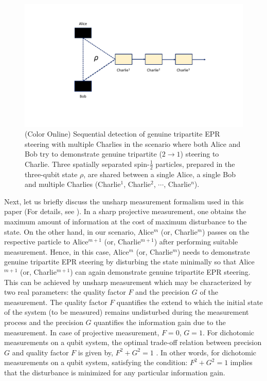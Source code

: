 \documentclass[pra,a4paper,aps,twocolumn,showpacs,superscriptaddress,groupedaddress]{revtex4}
\begin{document}
\begin{figure}[t!]
\centering
\includegraphics[scale=0.4]{Trusted2SDI.pdf}
\caption{(Color Online) Sequential detection of genuine tripartite EPR steering with multiple  Charlies in the scenario where both Alice and Bob try to demonstrate genuine tripartite ($2 \rightarrow 1$) steering to Charlie. Three spatially separated spin-$\frac{1}{2}$ particles,  prepared in the three-qubit state $\rho$,  are shared between a single Alice, a single Bob and multiple Charlies (Charlie$^1$, Charlie$^2$, $\cdots$, Charlie$^n$).  }
\label{fig4}
\end{figure}



Next, let us briefly discuss the unsharp measurement formalism used in this paper (For details, see \cite{sygp,majumdar,sas}). In a sharp projective measurement, one obtains the maximum amount of information at the cost of maximum disturbance to the state. On the other hand, in our scenario, Alice$^m$ (or, Charlie$^m$) passes on the respective particle to Alice$^{m+1}$ (or, Charlie$^{m+1}$) after performing suitable measurement. Hence, in this case, Alice$^m$ (or, Charlie$^m$) needs to demonstrate genuine tripartite EPR steering by disturbing the state minimally so that Alice$^{m+1}$ (or, Charlie$^{m+1}$) can again demonstrate genuine tripartite EPR steering. This can be achieved by unsharp measurement   \cite{sygp} which may be characterized by two real parameters: the quality factor $F$ and the precision $G$ of the measurement. The quality factor $F$ quantifies the extend to which the initial state of the system (to be measured) remains undisturbed during  the measurement process and the precision $G$ quantifies the information gain due to the measurement. In case of projective measurement, $F =0$, $G=1$. For dichotomic measurements on a qubit system, the optimal trade-off relation between precision $G$ and quality factor $F$ is given by, $F^2 + G^2 =1$ \cite{sygp}. In other words, for dichotomic measurements on a qubit system, satisfying the condition: $F^2 +G^2 = 1$ implies that the disturbance is minimized for any particular information gain.
\end{document}
